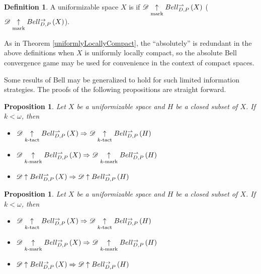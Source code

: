 \documentclass{amsart}
\newtheorem{proposition}[theorem]{Proposition}
\theoremstyle{definition}
\newtheorem{definition}[theorem]{Definition}
\begin{document}
  \begin{definition}
    A uniformizable space \(X\) is  if
    \(\mathscr{D} \underset{\text{mark}}{\uparrow} Bell_{D,P}^{\rightharpoonup}\left({X}\right)\) (\(\mathscr{D} \underset{\text{mark}}{\uparrow} Bell_{D,P}^{\to}\left({X}\right)\)).
  \end{definition}

  As in Theorem \ref{uniformlyLocallyCompact}, the ``absolutely''
  is redundant in the above definitions when \(X\) is uniformly locally compact,
  so the absolute Bell convergence game may be used for convenience in the
  context of compact spaces.

  Some results of Bell may be generalized to hold for such limited information
  strategies. The proofs of the following propositions are straight forward.

  \begin{proposition}
    Let \(X\) be a uniformizable space and \(H\) be a closed subset of \(X\).
    If \(k<\omega\), then
    \begin{itemize}
      \item
       \(
          \mathscr{D} \underset{k\text{-tact}}{\uparrow} Bell_{D,P}^{\rightharpoonup}\left({X}\right)
            \Rightarrow
          \mathscr{D} \underset{k\text{-tact}}{\uparrow} Bell_{D,P}^{\rightharpoonup}\left({H}\right)
       \)
      \item
       \(
          \mathscr{D} \underset{k\text{-mark}}{\uparrow} Bell_{D,P}^{\rightharpoonup}\left({X}\right)
            \Rightarrow
          \mathscr{D} \underset{k\text{-mark}}{\uparrow} Bell_{D,P}^{\rightharpoonup}\left({H}\right)
       \)
      \item
       \(
          \mathscr{D} \uparrow Bell_{D,P}^{\rightharpoonup}\left({X}\right)
            \Rightarrow
          \mathscr{D} \uparrow Bell_{D,P}^{\rightharpoonup}\left({H}\right)
       \)
    \end{itemize}
  \end{proposition}

  \begin{proposition}
    Let \(X\) be a uniformizable space and \(H\) be a closed subset of \(X\).
    If \(k<\omega\), then
    \begin{itemize}
      \item
       \(
          \mathscr{D} \underset{k\text{-tact}}{\uparrow} Bell_{D,P}^{\to}\left({X}\right)
            \Rightarrow
          \mathscr{D} \underset{k\text{-tact}}{\uparrow} Bell_{D,P}^{\to}\left({H}\right)
       \)
      \item
       \(
          \mathscr{D} \underset{k\text{-mark}}{\uparrow} Bell_{D,P}^{\to}\left({X}\right)
            \Rightarrow
          \mathscr{D} \underset{k\text{-mark}}{\uparrow} Bell_{D,P}^{\to}\left({H}\right)
       \)
      \item
       \(
          \mathscr{D} \uparrow Bell_{D,P}^{\to}\left({X}\right)
            \Rightarrow
          \mathscr{D} \uparrow Bell_{D,P}^{\to}\left({H}\right)
       \)
    \end{itemize}
  \end{proposition}
\end{document}

